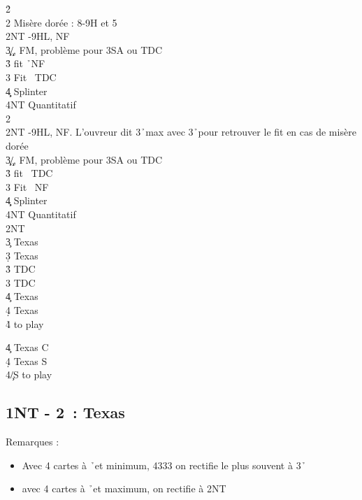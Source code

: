 \documentclass[a4paper]{article}
\begin{document}
\begin{bidtable}
2\h\+\\
2\s \> Misère dorée : 8-9H et 5\s \\
2NT -9HL, NF\\
3\c\d {}\c /\d , FM, problème pour 3SA ou TDC\\
3\h \> fit \h\ NF\\
3\s \> Fit \s\ TDC\\
4\c\d \> Splinter\\
4NT \> Quantitatif\-\\
2\s\+\\
2NT -9HL, NF. L'ouvreur dit 3\h\ max avec 3\h\ pour retrouver le fit en cas de misère dorée\\
3\c\d {}\c /\d , FM, problème pour 3SA ou TDC\\
3\h \> fit \s\ TDC\\
3\s \> Fit \s\ NF\\
4\c\d \> Splinter\\
4NT \> Quantitatif\-\\
2NT\+\\
3\c \> Texas \h \\
3\d \> Texas \s \\
3\h \> TDC\\
3\s \> TDC\\
4\c \> Texas \h \\
4\d \> Texas \s \\
4\h\s \> to play\-
\end{bidtable}

\begin{bidtable}
4\c \> Texas C\\
4\d \> Texas S\\
4\c/S \> to play
\end{bidtable}

\subsection{1NT - 2\pdfd\ : Texas \pdfh}

Remarques :

\begin{itemize}
\item Avec 4 cartes à \h\ et minimum, 4333 on rectifie le plus souvent à 3\h\ 

\item avec 4 cartes à \h\ et maximum, on rectifie à 2NT

\end{itemize}
\end{document}
